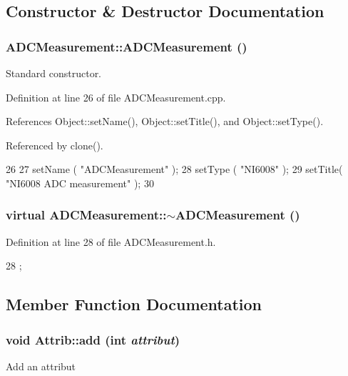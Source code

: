 \subsection{Constructor \& Destructor Documentation}
\hypertarget{classADCMeasurement_a93804f658f3aaa78d3ce18199f1bf8e1}{
\subsubsection[{ADCMeasurement}]{\setlength{\rightskip}{0pt plus 5cm}ADCMeasurement::ADCMeasurement ()}}
\label{classADCMeasurement_a93804f658f3aaa78d3ce18199f1bf8e1}


Standard constructor. 

Definition at line 26 of file ADCMeasurement.cpp.

References Object::setName(), Object::setTitle(), and Object::setType().

Referenced by clone().


\begin{DoxyCode}
26                                 {
27   setName ( "ADCMeasurement" );
28   setType ( "NI6008" );
29   setTitle( "NI6008 ADC measurement" );  
30 }
\end{DoxyCode}
\hypertarget{classADCMeasurement_aa89145ed91025783a1bb277cb480ed1c}{
\subsubsection[{$\sim$ADCMeasurement}]{\setlength{\rightskip}{0pt plus 5cm}virtual ADCMeasurement::$\sim$ADCMeasurement ()}}
\label{classADCMeasurement_aa89145ed91025783a1bb277cb480ed1c}


Definition at line 28 of file ADCMeasurement.h.


\begin{DoxyCode}
28 {}; 
\end{DoxyCode}


\subsection{Member Function Documentation}
\hypertarget{classAttrib_a235f773af19c900264a190b00a3b4ad7}{
\subsubsection[{add}]{\setlength{\rightskip}{0pt plus 5cm}void Attrib::add (int {\em attribut})}}
\label{classAttrib_a235f773af19c900264a190b00a3b4ad7}
Add an attribut 

